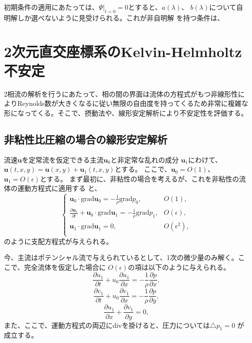 初期条件の適用にあたっては、$\Psi|_{t=0}=0$とすると、$a(\lambda)$、
$b(\lambda)$について自明解しか選べないように見受けられる。これが非自明解
を持つ条件は、


\section{2次元直交座標系のKelvin-Helmholtz不安定}
2相流の解析を行うにあたって、相の間の界面は流体の方程式がもつ非線形性に
よりReynolds数が大きくなるに従い無限の自由度を持ってくるため非常に複雑な
形になってくる。そこで、摂動法や、線形安定解析により不安定性を評価する。
\subsection{非粘性比圧縮の場合の線形安定解析}
流速$\bm{u}$を定常流を仮定できる主流$\bm{u}_0$と非定常な乱れの成分
$\bm{u}_1$にわけて、$\bm{u}(t,x,y)=\bm{u}(x,y)+\bm{u}_1(t,x,y)$とする。
ここで、$\bm{u}_0=O(1)$、$\bm{u}_1=O(\epsilon)$とする。
まず最初に、非粘性の場合を考えるが、これを非粘性の流体の運動方程式に適用する
と、
\begin{equation}
\begin{cases}
 \bm{u}_0\cdot\text{grad}\bm{u}_0 = -\frac{1}{\rho}\text{grad}p_0, 
 &O(1), \\
 \frac{\partial\bm{u}_1}{\partial t} + \bm{u}_0\cdot\text{grad}\bm{u}_1
 = -\frac{1}{\rho}\text{grad}p_1,
 & O(\epsilon), \\
 \bm{u}_1\cdot\text{grad}\bm{u}_1 = 0,
 & O(\epsilon^2), \\
\end{cases}
\end{equation}
のように支配方程式が与えられる。

今、主流はポテンシャル流で与えられているとして、1次の微少量のみ解く。ここで、完全流体を仮定した場合に
$O(\epsilon)$の項は以下のように与えられる。
\begin{equation}
 \frac{\partial u_1}{\partial t}
  +u_0\frac{\partial u_1}{\partial x}
  = -\frac{1}{\rho}\frac{\partial p}{\partial x},
\end{equation}
\begin{equation}
 \frac{\partial v_1}{\partial t}
  +u_0\frac{\partial v_1}{\partial x}
  = -\frac{1}{\rho}\frac{\partial p}{\partial y},
\end{equation}
\begin{equation}
 \frac{\partial u_1}{\partial x}
  + \frac{\partial v_1}{\partial y} = 0,
\end{equation}
また、ここで、運動方程式の両辺にdivを掛けると、圧力については$\triangle p_1=0$
が成立する。

